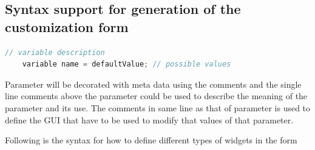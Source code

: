 \subsection{Syntax support for generation of the customization form}

    \begin{lstlisting}[language=c++]
    // variable description
    variable name = defaultValue; // possible values
    \end{lstlisting}

Parameter will be decorated with meta data using the comments and the single line comments above the parameter could be used to describe the meaning of the parameter and its use. The comments in same line as that of parameter is used to define the GUI that have to be used to modify that values of that parameter.

Following is the syntax for how to define different types of widgets in the form

